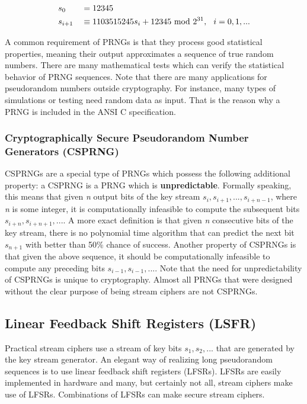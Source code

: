 \begin{alignat*}{2}
    &s_0&&=12345\\
    &s_{i+1}&&\equiv 1103515245s_i+12345\text{ mod } 2^{31}, \hspace{0.25cm} i=0,1,...
\end{alignat*}

A common requirement of PRNGs is that they process good statistical properties, meaning their output approximates a sequence of true random numbers. There are many mathematical tests which can verify the statistical behavior of PRNG sequences. Note that there are many applications for pseudorandom numbers outside cryptography. For instance, many types of simulations or testing need random data as input. That is the reason why a PRNG is included in the ANSI C specification.

\subsubsection{Cryptographically Secure Pseudorandom Number Generators (CSPRNG)}
CSPRNGs are a special type of PRNGs which possess the following additional property: a CSPRNG is a PRNG which is \textbf{unpredictable}. Formally speaking, this means that given \textit{n} output bits of the key stream $s_i,s_{i+1},...,s_{i+n-1}$, where \textit{n} is some integer, it is computationally infeasible to compute the subsequent bits $s_{i+n},s_{i+n+1},...$. A more exact definition is that given \textit{n} consecutive bits of the key stream, there is no polynomial time algorithm that can predict the next bit $s_{n+1}$ with better than 50\% chance of success. Another property of CSPRNGs is that given the above sequence, it should be computationally infeasible to compute any preceding bits $s_{i-1},s_{i-1},...$. Note that the need for unpredictability of CSPRNGs is unique to cryptography. Almost all PRNGs that were designed without the clear purpose of being stream ciphers are not CSPRNGs.

\newpage
\subsection{Linear Feedback Shift Registers (LSFR)}
Practical stream ciphers use a stream of key bits $s_1,s_2,...$ that are generated by the key stream generator. An elegant way of realizing long pseudorandom sequences is to use linear feedback shift registers (LFSRs). LFSRs are easily implemented in hardware and many, but certainly not all, stream ciphers make use of LFSRs. Combinations of LFSRs can make secure stream ciphers.\\

